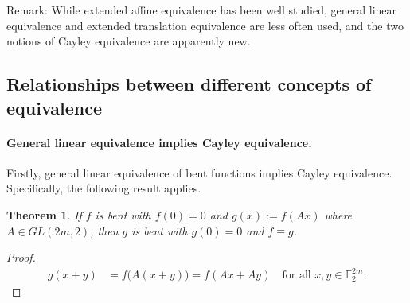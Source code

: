 \documentclass[12pt,a4paper]{article}
\newcommand{\mb}[1]{\mathbb{#1}}
\newcommand{\F}{\mb{F}}
\newtheorem{Theorem}{Theorem}
\begin{document}
Remark: While extended affine equivalence has been well studied,
general linear equivalence and extended translation equivalence are less often used,
and the two notions of Cayley equivalence are apparently new.


\subsection{Relationships between different concepts of equivalence}


\paragraph*{General linear equivalence implies Cayley equivalence.}

Firstly, general linear equivalence of bent functions implies Cayley equivalence.
Specifically, the following result applies.
\begin{Theorem}
\label{th-Linear-Cayley}
If $f$ is bent with $f(0)=0$ and $g(x) := f(A x)$ where $A \in GL(2m,2)$,
then $g$ is bent with $g(0)=0$ and $f \equiv g$.
\end{Theorem}
\begin{proof}
\begin{align*}
g(x+y) &= f\big(A(x+y)\big) = f(A x + A y)\quad \text{for all~} x,y \in \F_2^{2m}.
\end{align*}
\end{proof}
\end{document}

